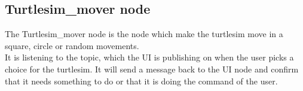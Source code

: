 \subsection{Turtlesim\_mover node}

The Turtlesim\_mover node is the node which make the turtlesim move in a square, circle or random movements.\\
It is listening to the topic, which the UI is publishing on when the user picks a choice for the turtlesim.
It will send a message back to the UI node and confirm that it needs something to do or that it is doing the command of the user.\\